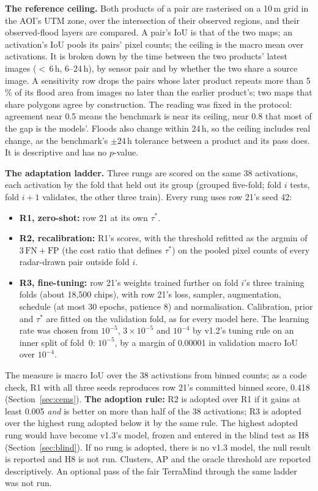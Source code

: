 \documentclass[10pt,twocolumn,a4paper]{article}
\newcommand{\pp}{\,\%}
\begin{document}
\textbf{The reference ceiling.} Both products of a pair are rasterised on a 10\,m grid in the AOI's UTM zone, over the
intersection of their observed regions, and their observed-flood layers are compared. A pair's IoU is that of the two
maps; an activation's IoU pools its pairs' pixel counts; the ceiling is the macro mean over activations. It is broken
down by the time between the two products' latest images ($<$\,6\,h, 6--24\,h), by sensor pair and by whether the
two share a source image. A sensitivity row drops the pairs whose later product repeats more than 5\pp{} of its
flood area from images no later than the earlier product's; two maps that share polygons agree by construction. The
reading was fixed in the protocol: agreement near 0.5 means the benchmark is near its ceiling, near 0.8 that most of
the gap is the models'. Floods also change within 24\,h, so the ceiling includes real change, as the benchmark's
$\pm24$\,h tolerance between a product and its pass does. It is descriptive and has no $p$-value.

\textbf{The adaptation ladder.} Three rungs are scored on the same 38 activations, each activation by the fold that
held out its group (grouped five-fold; fold $i$ tests, fold $i{+}1$ validates, the other three train). Every rung uses
row 21's seed 42:
\begin{itemize}
  \item \textbf{R1, zero-shot:} row 21 at its own $\tau^{*}$.
  \item \textbf{R2, recalibration:} R1's scores, with the threshold refitted as the argmin of $3\,\mathrm{FN} +
    \mathrm{FP}$ (the cost ratio that defines $\tau^{*}$) on the pooled pixel counts of every radar-drawn pair outside
    fold $i$.
  \item \textbf{R3, fine-tuning:} row 21's weights trained further on fold $i$'s three training folds (about 18,500
    chips), with row 21's loss, sampler, augmentation, schedule (at most 30 epochs, patience 8) and normalisation.
    Calibration, prior and $\tau^{*}$ are fitted on the validation fold, as for every model here. The learning rate
    was chosen from $10^{-5}$, $3\times10^{-5}$ and $10^{-4}$ by v1.2's tuning rule on an inner split of fold~0:
    $10^{-5}$, by a margin of 0.00001 in validation macro IoU over $10^{-4}$.
\end{itemize}
The measure is macro IoU over the 38 activations from binned counts; as a code check, R1 with all three seeds
reproduces row 21's committed binned score, 0.418 (Section~\ref{sec:cems}). \textbf{The adoption rule:} R2 is adopted over
R1 if it gains at least 0.005 \emph{and} is better on more than half of the 38 activations; R3 is adopted over the
highest rung adopted below it by the same rule. The highest adopted rung would have become v1.3's model, frozen and
entered in the blind test as H8 (Section~\ref{sec:blind}). If no rung is adopted, there is no v1.3 model, the null
result is reported and H8 is not run. Clusters, AP and the oracle threshold are reported descriptively. An optional
pass of the fair TerraMind through the same ladder was not run.
\end{document}
